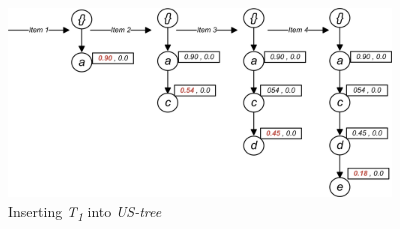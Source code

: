 %
%
\begin{figure}
  \centering
	\includegraphics[width=.8\textwidth,height=5cm]{images/sim_01.jpg}  
	\caption{Inserting \emph{T\textsubscript{1}} into \emph{US-tree}}
	\label{figure:t1}
\end{figure}

